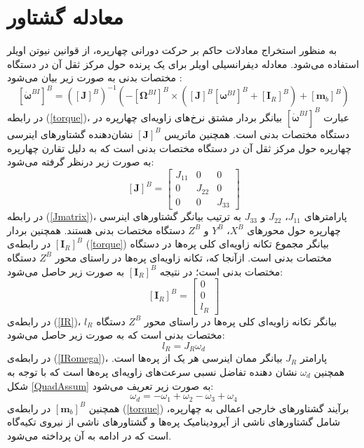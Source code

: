 \section{معادله گشتاور}
به منظور استخراج معادلات حاکم بر حرکت دورانی چهارپره، از قوانین نیوتن اویلر استفاده می‌شود. 
معادله دیفرانسیلی اویلر برای یک پرنده حول مرکز ثقل آن در دستگاه مختصات بدنی به صورت زیر بیان می‌شود \cite{zipfel2000modeling}:
\begin{equation}\label{torque}
	\left[\dot{\boldsymbol{\omega}}^{BI}\right]^B = \left(\left[\boldsymbol J\right]^B\right)^{-1}
	\left(-\left[\boldsymbol \Omega^{BI}\right]^B\times\left(
	\left[\boldsymbol J\right]^B\left[\boldsymbol \omega^{BI}\right]^B+
	\left[\boldsymbol I_R\right]^B
	\right)+ \left[\boldsymbol m_b\right]^B\right)
\end{equation}
در رابطه
(\ref{torque})، عبارت 
$\left[\dot{\boldsymbol\omega}^{BI}\right]^B$
بیانگر بردار مشتق نرخ‌های زاویه‌ای چهارپره در دستگاه مختصات بدنی است. همچنین ماتریس 
$\left[\boldsymbol J\right]^B$
نشان‌دهنده گشتاورهای اینرسی چهارپره حول مرکز ثقل آن در دستگاه مختصات بدنی است که به دلیل تقارن چهارپره به صورت زیر درنظر گرفته
 می‌شود:
 \begin{equation}\label{Jmatrix}
 	\left[\boldsymbol J\right]^B = \begin{bmatrix}
 		J_{11} & 0 &0\\
 		0 & J_{22} & 0\\
 		0 & 0 & J_{33}
 	\end{bmatrix}
 \end{equation}
در رابطه 
(\ref{Jmatrix})، پارامترهای 
$J_{11}$،
$J_{22}$
و 
$J_{33}$
به ترتیب بیانگر گشتاور‌های اینرسی چهارپره حول محورهای 
$X^B$،
$Y^B$
و 
$Z^B$
دستگاه مختصات بدنی هستند. همچنین بردار 
$\left[\boldsymbol I_R\right]^B$
در رابطه‌ی 
(\ref{torque})
بیانگر مجموع تكانه زاویه‌ای کلی پره‌ها در دستگاه مختصات بدنی است. ازآنجا که، تكانه زاویه‌ای پره‌ها در راستای محور
$Z^B$
دستگاه مختصات بدنی است؛ در نتیجه 
$\left[\boldsymbol I_R\right]^B$
به صورت زیر حاصل می‌شود:
\begin{equation}\label{IR}
	\left[\boldsymbol I_R\right]^B = 
	\begin{bmatrix}
		0\\0\\l_R
	\end{bmatrix}
\end{equation}
در رابطه‌ی 
(\ref{IR})، 
$l_R$
بیانگر تكانه زاویه‌ای کلی پره‌ها در راستای محور
$Z^B$
دستگاه مختصات بدنی است که به صورت زیر حاصل می‌شود:
\begin{equation}\label{IRomega}
	l_R = J_R\omega_d
\end{equation}
در رابطه‌ی
(\ref{IRomega})، پارامتر
$J_R$
بیانگر ممان اینرسی هر یک از پره‌ها است. همچنین
$\omega_d$
نشان دهنده تفاضل نسبی سرعت‌های زاویه‌ای پره‌ها است که با توجه به شكل
\ref{QuadAssum}
به صورت زیر تعریف می‌شود:
\begin{equation}\label{omega_d}
	\omega_d = -\omega_1 + \omega_2-\omega_3 + \omega_4
\end{equation}
همچنین 
$\left[\boldsymbol m_b\right]^B$
در رابطه‌ی
(\ref{torque})
برآیند گشتاورهای خارجی اعمالی به چهارپره، شامل 
گشتاورهای ناشی از آیرودینامیک پره‌ها و گشتاورهای ناشی از نیروی تكیه‌گاه است که در ادامه به آن پرداخته می‌شود.



